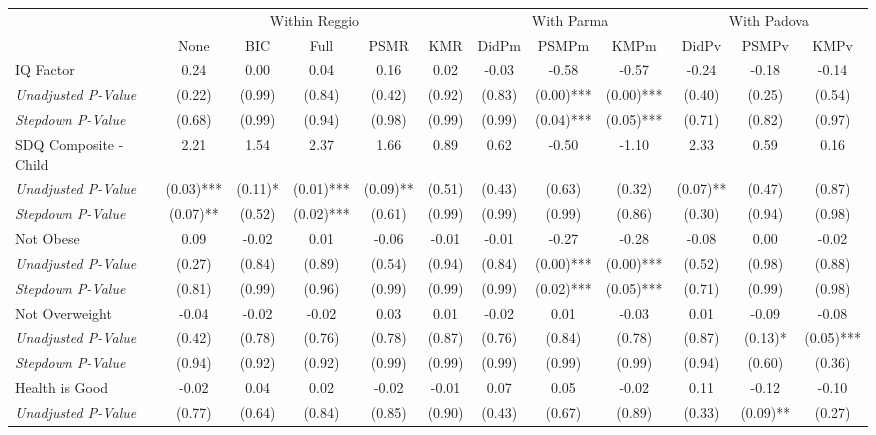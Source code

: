 \begin{tabular}{l c c c c c c c c c c c}
\toprule
& \multicolumn{5}{c}{Within Reggio} & \multicolumn{3}{c}{With Parma} & \multicolumn{3}{c}{With Padova} \\\cmidrule(lr){2-6} \cmidrule(lr){7-9} \cmidrule(lr){10-12}
 & None & BIC & Full & PSMR & KMR & DidPm & PSMPm & KMPm & DidPv & PSMPv & KMPv \\
\midrule
IQ Factor & 0.24 & 0.00 & 0.04 & 0.16 & 0.02 & -0.03 & -0.58 & -0.57 & -0.24 & -0.18 & -0.14 \\
\quad \textit{Unadjusted P-Value} & (0.22) & (0.99) & (0.84) & (0.42) & (0.92) & (0.83) & (0.00)*** & (0.00)*** & (0.40) & (0.25) & (0.54) \\
\quad \textit{Stepdown P-Value} & (0.68) & (0.99) & (0.94) & (0.98) & (0.99) & (0.99) & (0.04)*** & (0.05)*** & (0.71) & (0.82) & (0.97) \\
SDQ Composite - Child & 2.21 & 1.54 & 2.37 & 1.66 & 0.89 & 0.62 & -0.50 & -1.10 & 2.33 & 0.59 & 0.16 \\
\quad \textit{Unadjusted P-Value} & (0.03)*** & (0.11)* & (0.01)*** & (0.09)** & (0.51) & (0.43) & (0.63) & (0.32) & (0.07)** & (0.47) & (0.87) \\
\quad \textit{Stepdown P-Value} & (0.07)** & (0.52) & (0.02)*** & (0.61) & (0.99) & (0.99) & (0.99) & (0.86) & (0.30) & (0.94) & (0.98) \\
Not Obese & 0.09 & -0.02 & 0.01 & -0.06 & -0.01 & -0.01 & -0.27 & -0.28 & -0.08 & 0.00 & -0.02 \\
\quad \textit{Unadjusted P-Value} & (0.27) & (0.84) & (0.89) & (0.54) & (0.94) & (0.84) & (0.00)*** & (0.00)*** & (0.52) & (0.98) & (0.88) \\
\quad \textit{Stepdown P-Value} & (0.81) & (0.99) & (0.96) & (0.99) & (0.99) & (0.99) & (0.02)*** & (0.05)*** & (0.71) & (0.99) & (0.98) \\
Not Overweight & -0.04 & -0.02 & -0.02 & 0.03 & 0.01 & -0.02 & 0.01 & -0.03 & 0.01 & -0.09 & -0.08 \\
\quad \textit{Unadjusted P-Value} & (0.42) & (0.78) & (0.76) & (0.78) & (0.87) & (0.76) & (0.84) & (0.78) & (0.87) & (0.13)* & (0.05)*** \\
\quad \textit{Stepdown P-Value} & (0.94) & (0.92) & (0.92) & (0.99) & (0.99) & (0.99) & (0.99) & (0.99) & (0.94) & (0.60) & (0.36) \\
Health is Good & -0.02 & 0.04 & 0.02 & -0.02 & -0.01 & 0.07 & 0.05 & -0.02 & 0.11 & -0.12 & -0.10 \\
\quad \textit{Unadjusted P-Value} & (0.77) & (0.64) & (0.84) & (0.85) & (0.90) & (0.43) & (0.67) & (0.89) & (0.33) & (0.09)** & (0.27) \\

\end{tabular}
